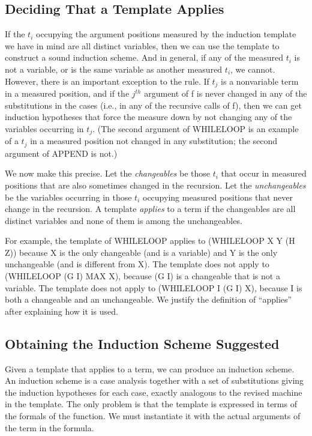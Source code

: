 \documentclass[11pt]{book}
\newcommand{\pubinlineunderline}[1]{\emph{#1}}
\newcommand{\pubdefaulttextsize}{\large}
\begin{document}
\subsection{Deciding That a Template Applies}
\pubdefaulttextsize
If the $t_{i}$ occupying the argument positions measured by the
induction template we have in mind
are all distinct variables, then we can use the template
to construct a sound induction scheme.
And in general, if any of the measured $t_{i}$ is not a variable,
or is the same variable as another measured  $t_{i}$, we
cannot.  However, there is an important exception to the rule.
If $t_{j}$ is a nonvariable term in a measured position, and if the $j^{th}$ argument of f is never
changed in any of the substitutions in the cases (i.e., in any of
the recursive calls of f), then we can get
induction hypotheses that force the measure  down by not
changing any of the variables occurring in $t_{j}$.  (The second
argument of WHILELOOP is an example of a $t_{j}$ in a
measured position not changed in any substitution; the second
argument of APPEND is not.)

We now make this precise.  Let the \pubinlineunderline{changeables} be those $t_{i}$ that occur
in measured positions that are also sometimes changed in the recursion.
Let the \pubinlineunderline{unchangeables} be the variables occurring in those $t_{i}$
occupying measured positions that never change in the recursion.
A template \pubinlineunderline{applies} to a term if the changeables are all distinct variables and none of
them is among the unchangeables.

For example, the template of WHILELOOP applies to (WHILELOOP X Y (H Z))
because X is the only changeable (and is a variable) and Y is the only
unchangeable (and is different from X).  The template does not apply to
(WHILELOOP (G I) MAX X), because (G I) is a changeable that is not a variable.
The template does not apply to (WHILELOOP I (G I) X), because I is both a
changeable and an unchangeable.
We justify the definition of ``applies'' after explaining how it is used.
\subsection{Obtaining the Induction Scheme Suggested}
\pubdefaulttextsize
Given  a template that applies to a term,
we can produce an induction scheme.  An induction scheme is
a case analysis together with a set of substitutions giving
the induction hypotheses for each case, exactly analogous to
the revised machine in the template.  The only problem is
that the template is expressed in terms of the formals of
the function.  We must instantiate it with the actual
arguments of the term in the formula. 
\end{document}
